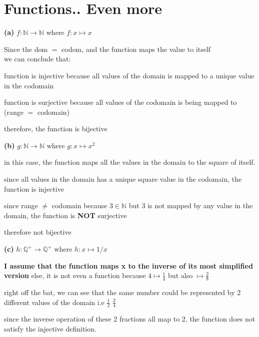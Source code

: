 \documentclass[12pts,A4]{article}
\begin{document}
\section{ Functions.. Even more}

\begin{flushleft}
    \textbf{(a)} $f: \mathbb{N} \rightarrow \mathbb{N}$ where $ f: x \mapsto x$
    
    \bigskip 

    Since the dom $=$ codom, and the function maps the value to itself\\
    we can conclude that:
    
    \bigskip
    
    function is injective because all values of the domain is mapped to a unique value in the codomain 
    
    function is surjective because all values of the codomain is being mapped to
    (range $=$ codomain)

    therefore, the function is bijective

    \bigskip



    \textbf{(b)} $g: \mathbb{N} \rightarrow \mathbb{N}$ where $ g: x \mapsto x^{2}$

    in this case, the function maps all the values in the domain to the square of itself.

    since all values in the domain has a unique square value in the codomain, the function is injective

    since range $\not =$ codomain because $ 3 \in \mathbb{N}$ but 3 is not mapped by any value in the domain, the function is \textbf{NOT} surjective

    therefore not bijective 

    \bigskip

    \textbf{(c)} $h: \mathbb{Q^{+}} \rightarrow \mathbb{Q^{+}}$ where $ h: x \mapsto 1/x$
    
    \textbf{ I assume that the function maps x to the inverse of its most simplified version} else, it is not even a function 
    because $ 4 \mapsto \frac{1}{4}$ but also $\mapsto \frac{2}{8}$
    
    right off the bat, we can see that the same number could be represented by 2 different values of the domain i.e $ \frac{1}{2}$ $\frac{2}{4} $

    since the inverse operation of these 2 fractions all map to 2, the function does not satisfy the injective definition.


\end{flushleft}
\end{document}
